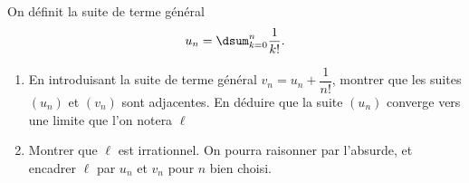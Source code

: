 On définit la suite de terme général
$$
u_n=\dsum_{k=0}^n\dfrac{1}{k!}.
$$
\begin{enumerate}
\item En introduisant la suite de terme général $v_n=u_n+\dfrac1{n!}$, montrer que les suites $\left(u_n\right)$ et $\left(v_n\right)$ sont adjacentes. En déduire que la suite $\left(u_n\right)$ converge vers une limite que l'on notera $\ell$
\item Montrer que $\ell$ est irrationnel. On pourra raisonner par l'absurde, et encadrer $\ell$ par $u_n$ et $v_n$ pour $n$ bien choisi.
\end{enumerate}

